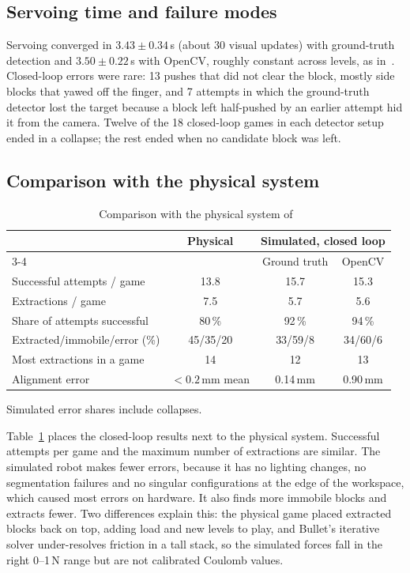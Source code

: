 \documentclass[conference]{IEEEtran}
\begin{document}
\subsection{Servoing time and failure modes}

Servoing converged in $3.43\pm0.34$\,s (about 30 visual updates) with ground-truth
detection and $3.50\pm0.22$\,s with OpenCV, roughly constant across levels, as
in~\cite{marchionna2023}. Closed-loop errors were rare: 13 pushes that did not clear the
block, mostly side blocks that yawed off the finger, and 7 attempts in which the
ground-truth detector lost the target because a block left half-pushed by an earlier
attempt hid it from the camera. Twelve of the 18 closed-loop games in each detector
setup ended in a collapse; the rest ended when no candidate block was left.

\subsection{Comparison with the physical system}

\begin{table}[t]
\centering
\caption{Comparison with the physical system of~\cite{marchionna2023}}
\label{tab:physical}
\footnotesize
\setlength{\tabcolsep}{4pt}
\begin{tabular}{@{}lccc@{}}
\toprule
 & Physical & \multicolumn{2}{c}{Simulated, closed loop} \\
\cmidrule(l){3-4}
 & \cite{marchionna2023} & Ground truth & OpenCV \\
\midrule
Successful attempts / game & 13.8 & 15.7 & 15.3 \\
Extractions / game & 7.5 & 5.7 & 5.6 \\
Share of attempts successful & 80\,\% & 92\,\% & 94\,\% \\
Extracted/immobile/error (\%) & 45/35/20 & 33/59/8 & 34/60/6 \\
Most extractions in a game & 14 & 12 & 13 \\
Alignment error & $<0.2$\,mm mean & 0.14\,mm & 0.90\,mm \\
\bottomrule
\end{tabular}

\vspace{2pt}
{\footnotesize Simulated error shares include collapses.}
\end{table}

Table~\ref{tab:physical} places the closed-loop results next to the physical system.
Successful attempts per game and the maximum number of extractions are similar. The
simulated robot makes fewer errors, because it has no lighting changes, no
segmentation failures and no singular configurations at the edge of the workspace,
which caused most errors on hardware. It also finds more immobile blocks and extracts
fewer. Two differences explain this: the physical game placed extracted blocks back
on top, adding load and new levels to play, and Bullet's iterative solver
under-resolves friction in a tall stack, so the simulated forces fall in the right
0--1\,N range but are not calibrated Coulomb values.
\end{document}
